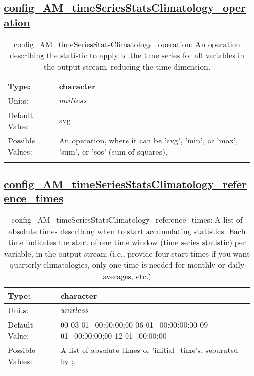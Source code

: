 \subsection[config\_AM\_timeSeriesStatsClimatology\_operation]{\hyperref[sec:nm_tab_AM_timeSeriesStatsClimatology]{config\_AM\_timeSeriesStatsClimatology\_operation}}
\label{subsec:nm_sec_config_AM_timeSeriesStatsClimatology_operation}
\begin{center}
\begin{longtable}{| p{2.0in} || p{4.0in} |}
    \hline
    Type: & character \\
    \hline
    Units: & $unitless$ \\
    \hline
    Default Value: & avg \\
    \hline
    Possible Values: & An operation, where it can be 'avg', 'min', or 'max', 'sum', or 'sos' (sum of squares). \\
    \hline
    \caption{config\_AM\_timeSeriesStatsClimatology\_operation: An operation describing the statistic to apply to the time series for all variables in the output stream, reducing the time dimension.}
\end{longtable}
\end{center}
\subsection[config\_AM\_timeSeriesStatsClimatology\_reference\_times]{\hyperref[sec:nm_tab_AM_timeSeriesStatsClimatology]{config\_AM\_timeSeriesStatsClimatology\_reference\_times}}
\label{subsec:nm_sec_config_AM_timeSeriesStatsClimatology_reference_times}
\begin{center}
\begin{longtable}{| p{2.0in} || p{4.0in} |}
    \hline
    Type: & character \\
    \hline
    Units: & $unitless$ \\
    \hline
    Default Value: & 00-03-01\_00:00:00;00-06-01\_00:00:00;00-09-01\_00:00:00;00-12-01\_00:00:00 \\
    \hline
    Possible Values: & A list of absolute times or 'initial\_time's, separated by ;. \\
    \hline
    \caption{config\_AM\_timeSeriesStatsClimatology\_reference\_times: A list of absolute times describing when to start accumulating statistics. Each time indicates the start of one time window (time series statistic) per variable, in the output stream (i.e., provide four start times if you want quarterly climatologies, only one time is needed for monthly or daily averages, etc.)}
\end{longtable}
\end{center}

